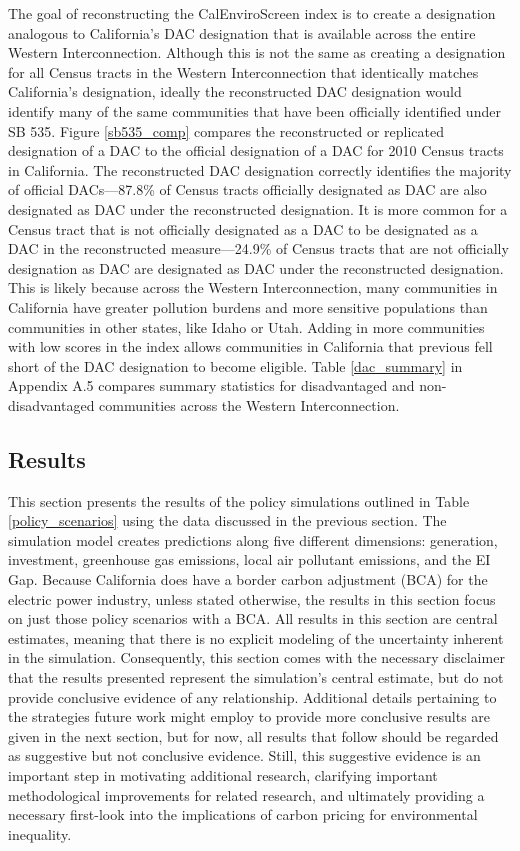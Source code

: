 The goal of reconstructing the CalEnviroScreen index is to create a designation analogous to California's DAC designation that is available across the entire Western Interconnection. Although this is not the same as creating a designation for all Census tracts in the Western Interconnection that identically matches California's designation, ideally the reconstructed DAC designation would identify many of the same communities that have been officially identified under SB 535. Figure \ref{sb535_comp} compares the reconstructed or replicated designation of a DAC to the official designation of a DAC for 2010 Census tracts in California. The reconstructed DAC designation correctly identifies the majority of official DACs---87.8\% of Census tracts officially designated as DAC are also designated as DAC under the reconstructed designation. It is more common for a Census tract that is not officially designated as a DAC to be designated as a DAC in the reconstructed measure---24.9\% of Census tracts that are not officially designation as DAC are designated as DAC under the reconstructed designation. This is likely because across the Western Interconnection, many communities in California have greater pollution burdens and more sensitive populations than communities in other states, like Idaho or Utah. Adding in more communities with low scores in the index allows communities in California that previous fell short of the DAC designation to become eligible. Table \ref{dac_summary} in Appendix A.5 compares summary statistics for disadvantaged and non-disadvantaged communities across the Western Interconnection.

\subsection{Results}

This section presents the results of the policy simulations outlined in Table \ref{policy_scenarios} using the data discussed in the previous section. The simulation model creates predictions along five different dimensions: generation, investment, greenhouse gas emissions, local air pollutant emissions, and the EI Gap. Because California does have a border carbon adjustment (BCA) for the electric power industry, unless stated otherwise, the results in this section focus on just those policy scenarios with a BCA. All results in this section are central estimates, meaning that there is no explicit modeling of the uncertainty inherent in the simulation. Consequently, this section comes with the necessary disclaimer that the results presented represent the simulation's central estimate, but do not provide conclusive evidence of any relationship. Additional details pertaining to the strategies future work might employ to provide more conclusive results are given in the next section, but for now, all results that follow should be regarded as suggestive but not conclusive evidence. Still, this suggestive evidence is an important step in motivating additional research, clarifying important methodological improvements for related research, and ultimately providing a necessary first-look into the implications of carbon pricing for environmental inequality. 

